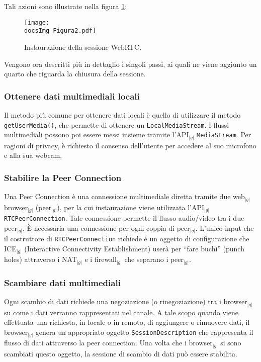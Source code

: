 {{		Tali azioni sono illustrate nella figura \ref{fig:figura2}:

		\begin{center}
			\begin{figure}[h]
				\centering
				\label{fig:figura2}
				\texttt{[image: \\docsImg Figura2.pdf]}
			\caption{Instaurazione della sessione WebRTC\g .}	
			\end{figure}
		\end{center}

		Vengono ora descritti più in dettaglio i singoli passi, ai quali ne viene aggiunto un quarto che riguarda la chiusura della sessione.


		\subsubsection{Ottenere dati multimediali locali}{
			Il metodo più comune per ottenere dati locali è quello di utilizzare il metodo \texttt{getUserMedia()}, 
			che permette di ottenere un \texttt{LocalMediaStream}. I flussi multimediali possono poi essere messi insieme tramite 
			l’API$_{|g|}$ \texttt{MediaStream}. Per ragioni di privacy, è richiesto il consenso dell’utente per accedere al 
			suo microfono e alla sua webcam.
		}

		\subsubsection{Stabilire la Peer Connection}{
			Una Peer Connection è una connessione multimediale diretta tramite due web$_{|g|}$ browser$_{|g|}$ (peer$_{|g|}$), 
			per la cui instaurazione viene utilizzata l’API$_{|g|}$ \texttt{RTCPeerConnection}. Tale connessione permette 
			il flusso audio/video tra i due peer$_{|g|}$. È necessaria una connessione per ogni coppia di peer$_{|g|}$. 
			L’unico input che il costruttore di \texttt{RTCPeerConnection} richiede è un oggetto di configurazione che ICE$_{|g|}$ 
			(Interactive Connectivity Establishment) userà per “fare buchi” (punch holes) attraverso i NAT$_{|g|}$ 
			e i firewall$_{|g|}$ che separano i peer$_{|g|}$.
		}

		\subsubsection{Scambiare dati multimediali}{
			Ogni scambio di dati richiede una negoziazione (o rinegoziazione) tra i browser$_{|g|}$ su come i dati verranno 
			rappresentati nel canale. A tale scopo quando viene effettuata una richiesta, in locale o in remoto, 
			di aggiungere o rimuovere dati, il browser$_{|g|}$ genera un appropriato oggetto \texttt{SessionDescription} che rappresenta 
			il flusso di dati attraverso la peer connection. Una volta che i browser$_{|g|}$ si sono scambiati questo oggetto, 
			la sessione di scambio di dati può essere stabilita.
		}
}}
